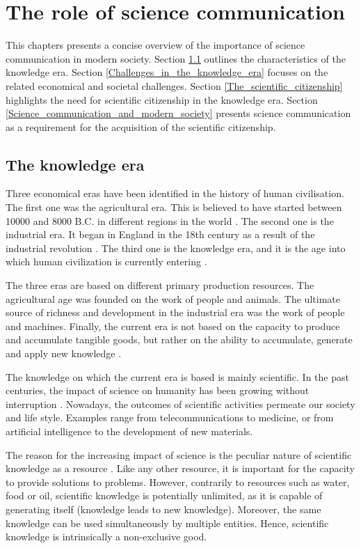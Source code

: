 \chapter{The role of science communication} \label{The_role_of_science_communication}
This chapters presents a concise overview of the importance of science communication in modern society. Section \ref{The_knowledge_era} outlines the characteristics of the knowledge era. Section \ref{Challenges_in_the_knowledge_era} focuses on the related economical and societal challenges. Section \ref{The_scientific_citizenship} highlights the need for scientific citizenship in the knowledge era. Section \ref{Science_communication_and_modern_society} presents science communication as a requirement for the acquisition of the scientific citizenship. 

\section{The knowledge era} \label{The_knowledge_era}
Three economical eras have been identified in the history of human civilisation. The first one was the agricultural era. This is believed to have started between 10000 and 8000 B.C. in different regions in the world \cite{Bocquet,Barker}. The second one is the industrial era. It began in England in the 18th century as a result of the industrial revolution \cite{Trinder, Griffin}. The third one is the knowledge era, and it is the age into which human civilization is currently entering \cite{Bohme-Stehr}. 

The three eras are based on different primary production resources. The agricultural age was founded on the work of people and animals. The ultimate source of richness and development in the industrial era was the work of people and machines. Finally, the current era is not based on the capacity to produce and accumulate tangible goods, but rather on the ability to accumulate, generate and apply new knowledge \cite{Powell}.

The knowledge on which the current era is based is mainly scientific. In the past centuries, the impact of science on humanity has been growing without interruption \cite{Pickstone}. Nowadays, the outcomes of scientific activities permeate our society and life style. Examples range from telecommunications to medicine, or from artificial intelligence to the development of new materials.

The reason for the increasing impact of science is the peculiar nature of scientific knowledge as a resource \cite{Probst}. Like any other resource, it is important for the capacity to provide solutions to problems. However, contrarily to resources such as water, food or oil, scientific knowledge is potentially unlimited, as it is capable of generating itself (knowledge leads to new knowledge). Moreover, the same knowledge can be used simultaneously by multiple entities. Hence, scientific knowledge is intrinsically a non-exclusive good.

